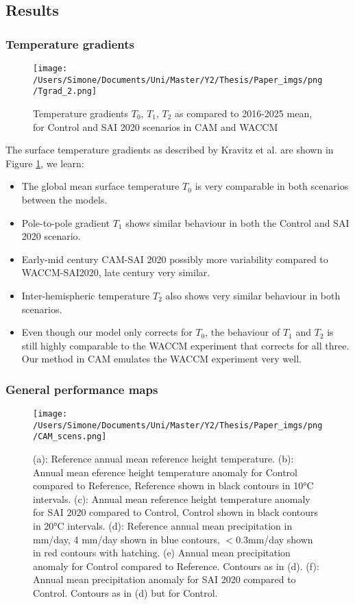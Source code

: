 \subsection{Results}
\subsubsection{Temperature gradients}

\begin{figure}[H]
	\centering
	\texttt{[image: /Users/Simone/Documents/Uni/Master/Y2/Thesis/Paper\_imgs/png/Tgrad\_2.png]}
	\caption{Temperature gradients $T_0$, $T_1$, $T_2$ as compared to 2016-2025 mean, for Control and SAI 2020 scenarios in CAM and WACCM}
	\label{fig:Tgrad}
\end{figure}

The surface temperature gradients as described by Kravitz et al. are shown in Figure \ref{fig:Tgrad}, we learn:
\begin{itemize}
	\item The global mean surface temperature $T_0$ is very comparable in both scenarios between the models.
	\item Pole-to-pole gradient $T_1$ shows similar behaviour in both the Control and SAI 2020 scenario.
	\item Early-mid century CAM-SAI 2020 possibly more variability compared to WACCM-SAI2020, late century very similar.
	\item Inter-hemispheric temperature $T_2$ also shows very similar behaviour in both scenarios. 
	
	\item Even though our model only corrects for $T_0$, the behaviour of $T_1$ and $T_2$ is still highly comparable to the WACCM experiment that corrects for all three. Our method in CAM emulates the WACCM experiment very well. 
\end{itemize}

\subsubsection{General performance maps}

\begin{figure}[H]
	\centering
	\texttt{[image: /Users/Simone/Documents/Uni/Master/Y2/Thesis/Paper\_imgs/png/CAM\_scens.png]}
	\caption{(a): Reference annual mean reference height temperature. (b): Annual mean eference height temperature anomaly for Control compared to Reference, Reference shown in black contours in 10°C intervals. (c): Annual mean reference height temperature anomaly for SAI 2020 compared to Control, Control shown in black contours in 20°C intervals. (d): Reference annual mean precipitation in mm/day, 4 mm/day shown in blue contours, $<0.3$mm/day shown in red contours with hatching. (e) Annual mean precipitation anomaly for Control compared to Reference. Contours as in (d). (f): Annual mean precipitation anomaly for SAI 2020 compared to Control. Contours as in (d) but for Control.}
	\label{fig:CAM_map}
\end{figure}

